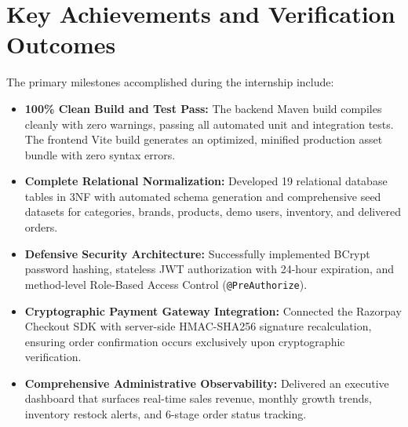 \section{Key Achievements and Verification Outcomes}
The primary milestones accomplished during the internship include:
\begin{itemize}[leftmargin=2.0em]
    \item \textbf{100\% Clean Build and Test Pass:} The backend Maven build compiles cleanly with zero warnings, passing all automated unit and integration tests. The frontend Vite build generates an optimized, minified production asset bundle with zero syntax errors.
    \item \textbf{Complete Relational Normalization:} Developed 19 relational database tables in 3NF with automated schema generation and comprehensive seed datasets for categories, brands, products, demo users, inventory, and delivered orders.
    \item \textbf{Defensive Security Architecture:} Successfully implemented BCrypt password hashing, stateless JWT authorization with 24-hour expiration, and method-level Role-Based Access Control (\texttt{@PreAuthorize}).
    \item \textbf{Cryptographic Payment Gateway Integration:} Connected the Razorpay Checkout SDK with server-side HMAC-SHA256 signature recalculation, ensuring order confirmation occurs exclusively upon cryptographic verification.
    \item \textbf{Comprehensive Administrative Observability:} Delivered an executive dashboard that surfaces real-time sales revenue, monthly growth trends, inventory restock alerts, and 6-stage order status tracking.
\end{itemize}

